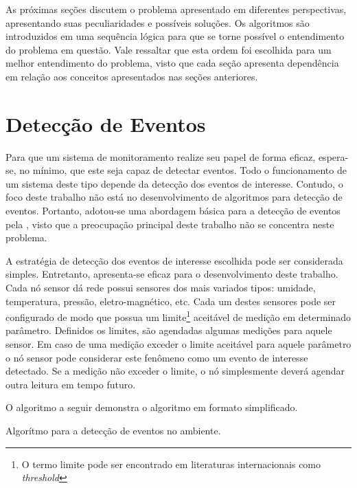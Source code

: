As próximas seções discutem o problema apresentado em diferentes perspectivas, apresentando suas peculiaridades e possíveis
soluções. Os algoritmos são introduzidos em uma sequência lógica para que se torne possível o entendimento do problema em questão. Vale 
ressaltar que esta ordem foi escolhida para um melhor entendimento do problema, visto que cada seção apresenta dependência em relação aos conceitos
apresentados nas seções anteriores. 

\section{Detecção de Eventos}
Para que um sistema de monitoramento realize seu papel de forma eficaz, espera-se, no mínimo, que este seja capaz de detectar eventos. Todo o funcionamento
de um sistema deste tipo depende da detecção dos eventos de interesse. Contudo, o foco deste trabalho não está no desenvolvimento de algoritmos para 
detecção de eventos. Portanto, adotou-se uma abordagem básica para a detecção de eventos pela \rssf, visto que a preocupação principal deste trabalho não se concentra neste problema.

A estratégia de detecção dos eventos de interesse escolhida pode ser considerada simples. Entretanto, apresenta-se eficaz para o desenvolvimento deste trabalho.
Cada nó sensor dá rede possui sensores dos mais variados tipos: umidade, temperatura, pressão, eletro-magnético, etc. Cada um destes sensores pode ser
configurado de modo que possua um limite\footnote{O termo limite pode ser encontrado em literaturas internacionais como \emph{threshold}} aceitável de medição em determinado parâmetro. Definidos os limites, são agendadas algumas medições para aquele sensor. Em caso de uma medição exceder o limite aceitável
para aquele parâmetro o nó sensor pode considerar este fenômeno como um evento de interesse detectado. Se a medição não exceder o limite, o nó simplesmente
deverá agendar outra leitura em tempo futuro.

O algoritmo a seguir demonstra o algoritmo em formato simplificado. \\

\begin{algorithm}[H]
	\SetAlgoLined
	

	
\caption{Algorítmo para a detecção de eventos no ambiente.}
\end{algorithm}


